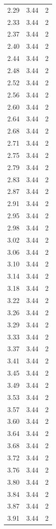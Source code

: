 \begin{longtable}{lrr}
  2.29 & 3.44 & 2 \\
  2.33 & 3.44 & 2 \\
  2.37 & 3.44 & 2 \\
  2.40 & 3.44 & 2 \\
  2.44 & 3.44 & 2 \\
  2.48 & 3.44 & 2 \\
  2.52 & 3.44 & 2 \\
  2.56 & 3.44 & 2 \\
  2.60 & 3.44 & 2 \\
  2.64 & 3.44 & 2 \\
  2.68 & 3.44 & 2 \\
  2.71 & 3.44 & 2 \\
  2.75 & 3.44 & 2 \\
  2.79 & 3.44 & 2 \\
  2.83 & 3.44 & 2 \\
  2.87 & 3.44 & 2 \\
  2.91 & 3.44 & 2 \\
  2.95 & 3.44 & 2 \\
  2.98 & 3.44 & 2 \\
  3.02 & 3.44 & 2 \\
  3.06 & 3.44 & 2 \\
  3.10 & 3.44 & 2 \\
  3.14 & 3.44 & 2 \\
  3.18 & 3.44 & 2 \\
  3.22 & 3.44 & 2 \\
  3.26 & 3.44 & 2 \\
  3.29 & 3.44 & 2 \\
  3.33 & 3.44 & 2 \\
  3.37 & 3.44 & 2 \\
  3.41 & 3.44 & 2 \\
  3.45 & 3.44 & 2 \\
  3.49 & 3.44 & 2 \\
  3.53 & 3.44 & 2 \\
  3.57 & 3.44 & 2 \\
  3.60 & 3.44 & 2 \\
  3.64 & 3.44 & 2 \\
  3.68 & 3.44 & 2 \\
  3.72 & 3.44 & 2 \\
  3.76 & 3.44 & 2 \\
  3.80 & 3.44 & 2 \\
  3.84 & 3.44 & 2 \\
  3.87 & 3.44 & 2 \\
  3.91 & 3.44 & 2 \\

\end{longtable}
